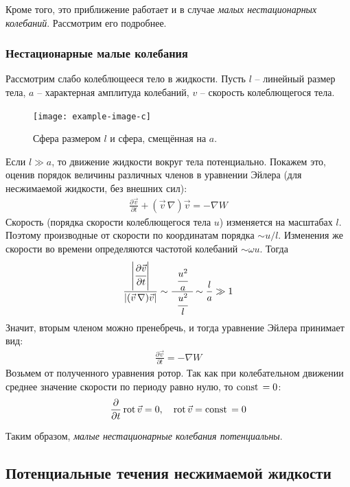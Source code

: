 Кроме того, это приближение работает и в случае \textit{малых нестационарных колебаний}. Рассмотрим его подробнее.


\subsubsection{Нестационарные малые колебания}
Рассмотрим слабо колеблющееся тело в жидкости. Пусть $l$ -- линейный размер тела, $a$ -- характерная амплитуда колебаний, $v$ -- скорость колеблющегося тела.
\begin{figure}[H]
	\centering
	\texttt{[image: example-image-c]}
	\caption{Сфера размером $l$ и сфера, смещённая на $a$.}
	\label{fig:figure15}
\end{figure}
Если $l \gg a$, то движение жидкости вокруг тела потенциально. Покажем это, оценив порядок величины различных членов в уравнении Эйлера (для несжимаемой жидкости, без внешних сил):
\begin{align*}
\frac { \partial \vec{v} } { \partial t } + ( \vec{v}\,\nabla ) \vec{v} = - \nabla W
\end{align*}
Скорость (порядка скорости колеблющегося тела $u$) изменяется на  масштабах $l$. Поэтому производные от скорости по координатам порядка $\sim u/l$. Изменения же скорости во времени определяются частотой колебаний $\sim \omega u$. Тогда
\begin{align*}
\frac{
\left| \cfrac { \partial \vec{v} } { \partial t } \right|} {\left| (\vec{v}\,\nabla ) \vec{v} \right|} \sim \cfrac{\phantom{a}\cfrac { u ^ { 2 } } { a }\phantom{a}} { \cfrac { u ^ { 2 } }{ l } } \sim \frac { l } { a } \gg 1
\end{align*}
Значит, вторым членом можно пренебречь, и тогда уравнение Эйлера принимает вид:
\begin{align*}
\frac { \partial \vec{v} } { \partial t } = - \nabla W
\end{align*}
Возьмем от полученного уравнения ротор. Так как при колебательном движении среднее значение скорости по периоду равно нулю, то $\mathrm{const}\,=0$:
\begin{align*}
\pdv{t}  \operatorname{rot}  \vec{v} = 0 , \quad\operatorname{rot}\vec{v} =  \mathrm{const}\,  = 0
\end{align*}


Таким образом, \textit{малые нестационарные колебания потенциальны}.


\subsection{Потенциальные течения несжимаемой жидкости}

